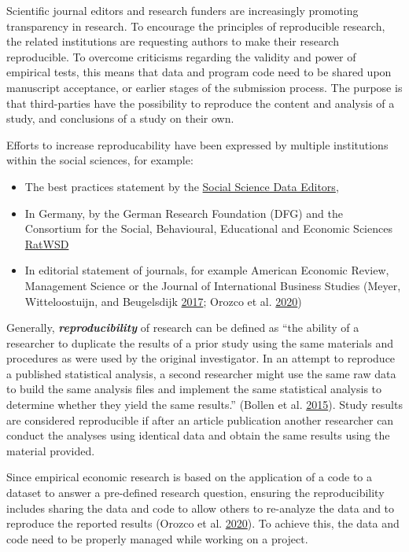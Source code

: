 \documentclass[
]{book}
\providecommand{\tightlist}{%
  \setlength{\itemsep}{0pt}\setlength{\parskip}{0pt}}
\begin{document}
Scientific journal editors and research funders are increasingly
promoting transparency in research. To encourage the principles of
reproducible research, the related institutions are requesting authors
to make their research reproducible. To overcome criticisms regarding
the validity and power of empirical tests, this means that data and
program code need to be shared upon manuscript acceptance, or earlier
stages of the submission process. The purpose is that third-parties have
the possibility to reproduce the content and analysis of a study, and
conclusions of a study on their own.

Efforts to increase reproducability have been expressed by multiple
institutions within the social sciences, for example:

\begin{itemize}
\tightlist
\item
  The best practices statement by the
  \href{https://social-science-data-editors.github.io/template_README/}{Social
  Science Data Editors},
\item
  In Germany, by the German Research Foundation (DFG) and the Consortium
  for the Social, Behavioural, Educational and Economic Sciences
  \href{https://www.ratswd.de/en/publikationen/output}{RatWSD}
\item
  In editorial statement of journals, for example American Economic
  Review, Management Science or the Journal of International Business
  Studies (Meyer, Witteloostuijn, and Beugelsdijk
  \protect\hyperlink{ref-meyer_whats_2017}{2017}; Orozco et al.
  \protect\hyperlink{ref-orozco_how_2020}{2020})
\end{itemize}

Generally, \textbf{\emph{reproducibility}} of research can be defined as
``the ability of a researcher to duplicate the results of a prior study
using the same materials and procedures as were used by the original
investigator. In an attempt to reproduce a published statistical
analysis, a second researcher might use the same raw data to build the
same analysis files and implement the same statistical analysis to
determine whether they yield the same results.'' (Bollen et al.
\protect\hyperlink{ref-bollen_social_2015}{2015}). Study results are
considered reproducible if after an article publication another
researcher can conduct the analyses using identical data and obtain the
same results using the material provided.

Since empirical economic research is based on the application of a code
to a dataset to answer a pre-defined research question, ensuring the
reproducibility includes sharing the data and code to allow others to
re-analyze the data and to reproduce the reported results (Orozco et al.
\protect\hyperlink{ref-orozco_how_2020}{2020}). To achieve this, the
data and code need to be properly managed while working on a project.
\end{document}
